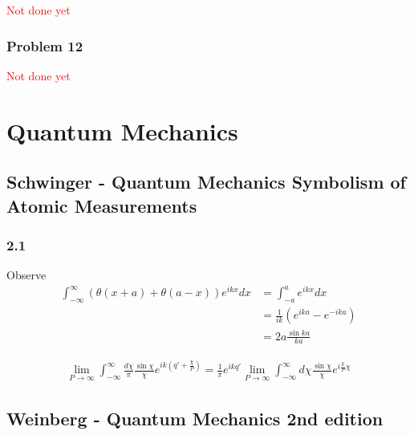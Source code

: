 \documentclass[10pt,a4paper]{article}
\theoremstyle{definition}
\begin{document}
\textcolor{red}{Not done yet}
\subsubsection{Problem 12}
\textcolor{red}{Not done yet}

\section{Quantum Mechanics}
\subsection{{\sc Schwinger} - Quantum Mechanics Symbolism of Atomic Measurements}
\subsubsection{2.1}
Observe
\begin{align}
    \int_{-\infty}^\infty\left(\theta(x+a)+\theta(a-x)\right)e^{ikx}dx
    &=\int_{-a}^ae^{ikx}dx\\
    &=\frac{1}{ik}\left(e^{ika}-e^{-ika}\right)\\
    &=2a \frac{\sin ka}{ka}
\end{align} 

\begin{align}
    \lim_{P\rightarrow\infty}\int_{-\infty}^\infty\frac{d\chi}{\pi}\frac{\sin\chi}{\chi}e^{ik\left(q'+\frac{\chi}{P}\right)}=\frac{1}{\pi}e^{ikq'}\lim_{P\rightarrow\infty}\int_{-\infty}^\infty d\chi\frac{\sin\chi}{\chi}e^{i\frac{k}{P}\chi}
\end{align} 



\subsection{{\sc Weinberg} - Quantum Mechanics 2nd edition}
\end{document}
